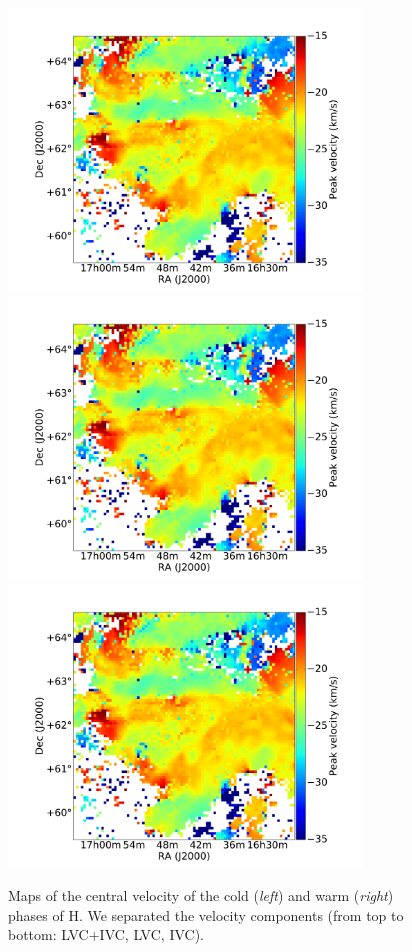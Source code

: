 \documentclass[traditabstract]{aa}
\begin{document}
\begin{figure}[h]
  \hspace{3mm}                                
  \includegraphics[page=5,height=7.5cm,trim=55 5 55 35,clip=true]{Figures/GHIGLS_velo.pdf} \\
  \vspace{3mm}                                
  \includegraphics[page=3,height=7.5cm,trim=55 5 55 35,clip=true]{Figures/GHIGLS_velo.pdf}
  \hspace{3mm}                                
  \includegraphics[page=6,height=7.5cm,trim=55 5 55 35,clip=true]{Figures/GHIGLS_velo.pdf}
  \caption{Maps of the central velocity of the cold (\emph{left}) and warm (\emph{right}) phases of H. We separated the velocity components (from top to bottom: LVC+IVC, LVC, IVC).}
\end{figure}
\end{document}
